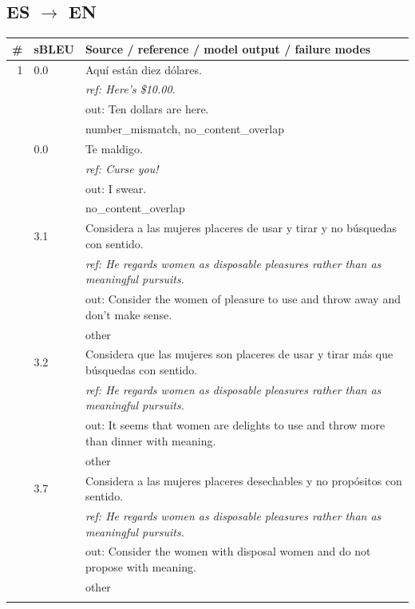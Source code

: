 \subsection*{ES $\rightarrow$ EN}
\begin{longtable}{@{}rp{0.7cm}p{11cm}@{}}
\toprule
\# & sBLEU & Source / reference / model output / failure modes \\
\midrule
\endhead
1 & 0.0 & \small Aquí están diez dólares. \\
& & \small\itshape ref: Here's \$10.00. \\
& & \small\ttfamily out: Ten dollars are here. \\
& & \scriptsize number\_mismatch, no\_content\_overlap \\\addlinespace
2 & 0.0 & \small Te maldigo. \\
& & \small\itshape ref: Curse you! \\
& & \small\ttfamily out: I swear. \\
& & \scriptsize no\_content\_overlap \\\addlinespace
3 & 3.1 & \small Considera a las mujeres placeres de usar y tirar y no búsquedas con sentido. \\
& & \small\itshape ref: He regards women as disposable pleasures rather than as meaningful pursuits. \\
& & \small\ttfamily out: Consider the women of pleasure to use and throw away and don't make sense. \\
& & \scriptsize other \\\addlinespace
4 & 3.2 & \small Considera que las mujeres son placeres de usar y tirar más que búsquedas con sentido. \\
& & \small\itshape ref: He regards women as disposable pleasures rather than as meaningful pursuits. \\
& & \small\ttfamily out: It seems that women are delights to use and throw more than dinner with meaning. \\
& & \scriptsize other \\\addlinespace
5 & 3.7 & \small Considera a las mujeres placeres desechables y no propósitos con sentido. \\
& & \small\itshape ref: He regards women as disposable pleasures rather than as meaningful pursuits. \\
& & \small\ttfamily out: Consider the women with disposal women and do not propose with meaning. \\
& & \scriptsize other \\\addlinespace

\end{longtable}
